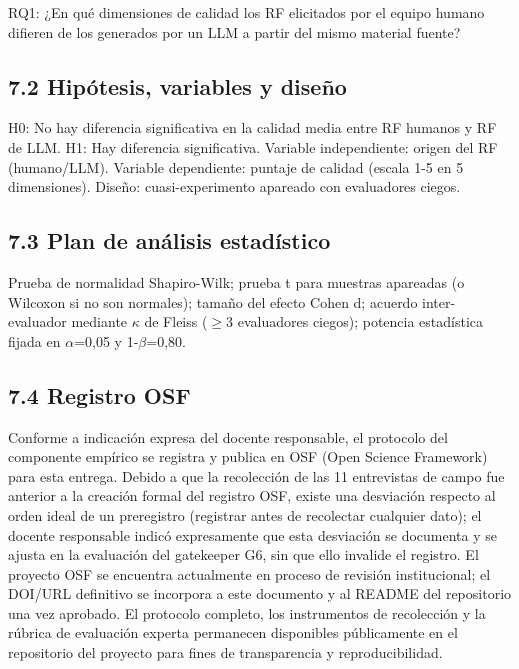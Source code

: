 RQ1: ¿En qué dimensiones de calidad los RF elicitados por el equipo humano difieren de los generados por un LLM a partir del mismo material fuente?


\subsection*{7.2 Hipótesis, variables y diseño}


H0: No hay diferencia significativa en la calidad media entre RF humanos y RF de LLM. H1: Hay diferencia significativa. Variable independiente: origen del RF (humano/LLM). Variable dependiente: puntaje de calidad (escala 1-5 en 5 dimensiones). Diseño: cuasi-experimento apareado con evaluadores ciegos.


\subsection*{7.3 Plan de análisis estadístico}


Prueba de normalidad Shapiro-Wilk; prueba t para muestras apareadas (o Wilcoxon si no son normales); tamaño del efecto Cohen d; acuerdo inter-evaluador mediante $\kappa$ de Fleiss ($\geq$3 evaluadores ciegos); potencia estadística fijada en $\alpha$=0,05 y 1-$\beta$=0,80.


\subsection*{7.4 Registro OSF}


Conforme a indicación expresa del docente responsable, el protocolo del componente empírico se registra y publica en OSF (Open Science Framework) para esta entrega. Debido a que la recolección de las 11 entrevistas de campo fue anterior a la creación formal del registro OSF, existe una desviación respecto al orden ideal de un preregistro (registrar antes de recolectar cualquier dato); el docente responsable indicó expresamente que esta desviación se documenta y se ajusta en la evaluación del gatekeeper G6, sin que ello invalide el registro. El proyecto OSF se encuentra actualmente en proceso de revisión institucional; el DOI/URL definitivo se incorpora a este documento y al README del repositorio una vez aprobado. El protocolo completo, los instrumentos de recolección y la rúbrica de evaluación experta permanecen disponibles públicamente en el repositorio del proyecto para fines de transparencia y reproducibilidad.


